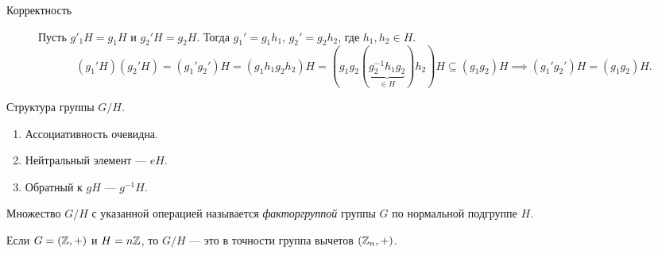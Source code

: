 \begin{description}
\item[Корректность] 
    Пусть $g'_1 H = g_1 H$ и $g_2' H = g_2 H$. 
    Тогда $g_1' = g_1 h_1$, $g_2' = g_2 h_2$, где $h_1, h_2 \in H$.
    \begin{equation*}
        (g_1'H)(g_2' H) = (g_1' g_2')H = (g_1 h_1 g_2 h_2) H = (g_1 g_2 (\underbrace{g_2^{-1} h_1 g_2}_{\in H}) h_2) H \subseteq (g_1 g_2) H \implies (g_1' g_2') H = (g_1 g_2) H
    .\end{equation*}
\end{description}

Структура группы $G / H$.
\begin{enumerate}[nosep]
\item Ассоциативность очевидна.
\item Нейтральный элемент --- $eH$.
\item Обратный к $gH$ --- $g^{-1}H$.
\end{enumerate}

\begin{definition}
    Множество $G / H$ с указанной операцией называется \textit{факторгруппой} группы $G$ по нормальной подгруппе $H$.
\end{definition}

\begin{example}
    Если $G = (\mathbb{Z}, +)$ и $H = n\mathbb{Z}$, то $G / H$ --- это в точности группа вычетов $(\mathbb{Z}_n, +)$.
\end{example}
